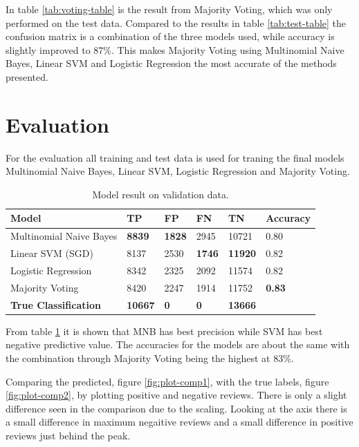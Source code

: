In table \ref{tab:voting-table} is the result from Majority Voting, which was only performed on the test data. 
Compared to the results in table \ref{tab:test-table} the confusion matrix is a combination of the three models used, while accuracy is slightly improved to 87\%. 
This makes Majority Voting using Multinomial Naive Bayes, Linear SVM and Logistic Regression the most accurate of the methods presented. 


\section{Evaluation}
\label{sec:evaluation-result}

For the evaluation all training and test data is used for traning the final models Multinomial Naive Bayes, Linear SVM, Logistic Regression and Majority Voting. 

\begin{table}[H]
    \centering
    \caption{Model result on validation data.}
    \label{tab:validation-table}
    \begin{tabular}{@{}llllll@{}}
    \toprule
    Model                        & TP             & FP            & FN            & TN             & Accuracy      \\ \midrule
    Multinomial Naive Bayes      & \textbf{8839}  & \textbf{1828} & 2945          & 10721          & 0.80          \\
    Linear SVM (SGD)             & 8137           & 2530          & \textbf{1746} & \textbf{11920} & 0.82          \\
    Logistic Regression          & 8342           & 2325          & 2092          & 11574          & 0.82          \\
    Majority Voting              & 8420           & 2247          & 1914          & 11752          & \textbf{0.83} \\ \midrule
    \textbf{True Classification} & \textbf{10667} & \textbf{0}    & \textbf{0}    & \textbf{13666} &              
    \end{tabular}
\end{table}

From table \ref{tab:validation-table} it is shown that MNB has best precision while SVM has best negative predictive value. 
The accuracies for the models are about the same with the combination through Majority Voting being the highest at 83\%.


Comparing the predicted, figure \ref{fig:plot-comp1}, with the true labels, figure \ref{fig:plot-comp2}, by plotting positive and negative reviews. 
There is only a slight difference seen in the comparison due to the scaling. 
Looking at the axis there is a small difference in maximum negaitive reviews and a small difference in positive reviews just behind the peak. 

